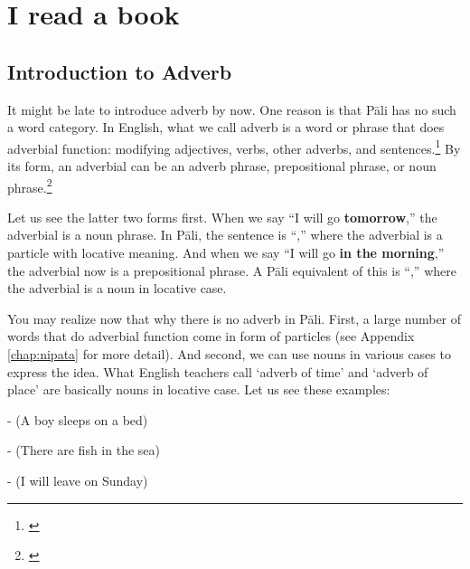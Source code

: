\chapter{I read a book }\label{chap:adv}

{}
\section*{Introduction to Adverb}

It might be late to introduce adverb by now. One reason is that P\=ali has no such a word category. In English, what we call adverb is a word or phrase that does adverbial function: modifying adjectives, verbs, other adverbs, and sentences.\footnote{\citealp[p.~13]{brownmiller:dict}} By its form, an adverbial can be an adverb phrase, prepositional phrase, or noun phrase.\footnote{\citealp[\S206]{eastwood:guide}}

Let us see the latter two forms first. When we say ``I will go \textbf{tomorrow},'' the adverbial is a noun phrase. In P\=ali, the sentence is ``,'' where the adverbial is a particle with locative meaning. And when we say ``I will go \textbf{in the morning},'' the adverbial now is a prepositional phrase. A P\=ali equivalent of this is ``,'' where the adverbial is a noun in locative case.

You may realize now that why there is no adverb in P\=ali. First, a large number of words that do adverbial function come in form of particles (see Appendix \ref{chap:nipata} for more detail). And second, we can use nouns in various cases to express the idea. What English teachers call `adverb of time' and `adverb of place' are basically nouns in locative case. Let us see these examples:\par
-  (A boy sleeps on a bed)\par
-  (There are fish in the sea)\par
-  (I will leave on Sunday)\par


